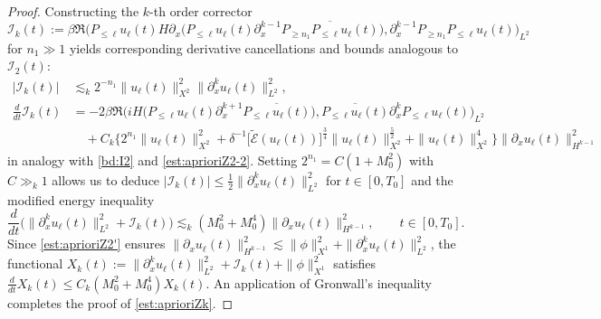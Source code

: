 \documentclass[10pt,a4paper]{amsart}
\begin{document}
\begin{proof}
Constructing the $k$-th order corrector 
$$
    \mathcal{I}_k(t) := \beta\Re \big( P_{\leq \ell}u_\ell(t)H\partial_x\big(P_{\leq \ell}u_\ell(t)\partial_x^{k-1}\overline{P_{\geq n_1}P_{\leq \ell}u_\ell(t)}\big) ,\partial_x^{k-1}P_{\geq n_1}P_{\leq \ell}u_\ell(t)\big)_{L^2}
$$
for $n_1 \gg 1$ yields corresponding derivative cancellations and bounds analogous to $\mathcal{I}_2(t)$:
\begin{align*}
|\mathcal{I}_k(t)|
&\lesssim_k 2^{-n_1}\| u_\ell(t) \|_{X^2}^2\| \partial_x^k u_\ell(t) \|_{L^2}^2, \\
\frac{d}{dt}\mathcal{I}_k(t)&=- 2\beta \Re \big( iH\big(P_{\leq \ell}u_\ell(t)\partial_x^{k+1}\overline{P_{\leq \ell}u_\ell(t)}\big) ,\overline{P_{\leq \ell}u_\ell(t)}\partial_x^kP_{\leq \ell}u_\ell(t)\big)_{L^2} \\
&\quad +C_k\Big\{ 2^{n_1}\| u_\ell(t)\|_{X^2}^2+ \delta^{-1}\big[ \widetilde{\mathcal{E}}(u_\ell(t))\big] ^{\frac34}\| u_\ell(t)\|_{X^2}^{\frac52}+\| u_\ell(t)\|_{X^2}^4\Big\} \| \partial_xu_\ell(t)\|_{H^{k-1}}^2
\end{align*}
in analogy with \eqref{bd:I2} and \eqref{est:aprioriZ2-2}.
Setting $2^{n_1} = C(1+M_0^2)$ with $C\gg _k 1$ allows us to deduce $|\mathcal{I}_k(t)| \leq \frac{1}{2} \| \partial_x^k u_\ell(t) \|_{L^2}^2$ for $t\in[0, T_0]$ and the modified energy inequality
$$\frac{d}{dt}\big( \| \partial_x^ku_\ell(t) \|_{L^2}^2+\mathcal{I}_k(t)\big) \lesssim_k (M_0^2+M_0^4)\| \partial_xu_\ell(t) \|_{H^{k-1}}^2,\qquad t\in [0,T_0]. $$Since \eqref{est:aprioriZ2'} ensures $\| \partial_xu_\ell(t) \|_{H^{k-1}}^2 \lesssim \| \phi \|_{X^1}^2 + \| \partial_x^ku_\ell(t) \|_{L^2}^2$, the functional $X_k(t) := \| \partial_x^ku_\ell(t) \|_{L^2}^2+\mathcal{I}_k(t)+\| \phi \|_{X^1}^2$ satisfies $\frac{d}{dt}X_k(t) \leq C_k(M_0^2+M_0^4)X_k(t)$. An application of Gronwall's inequality completes the proof of \eqref{est:aprioriZk}.
\end{proof}
\end{document}
